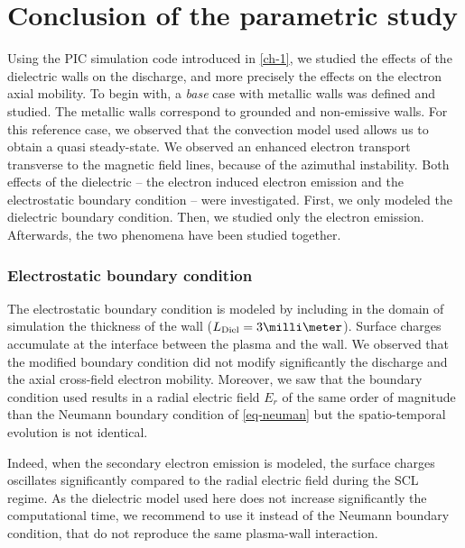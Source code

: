 
\section{Conclusion of the parametric study}
  \label{sec-conclusion_ch2}
  
  Using the \ac{PIC} simulation code introduced in \cref{ch-1}, we studied the effects of the dielectric walls on the discharge, and more precisely the effects on the electron axial mobility.
  To begin with, a \emph{base} case with metallic walls was defined and studied.
  The metallic walls correspond to grounded and non-emissive walls.
  For this reference case, we observed that the convection model used allows us to obtain a quasi steady-state.
  We observed an enhanced electron transport transverse to the magnetic field lines, because of the azimuthal instability.
  Both effects of the dielectric -- the electron induced electron emission and the electrostatic boundary condition -- were investigated.
  First, we  only modeled the dielectric boundary condition. Then, we studied only the electron emission. Afterwards, the two phenomena have been studied together.
  
  \subsubsection*{Electrostatic boundary condition}
  
  The electrostatic boundary condition is modeled by including in the domain of simulation the thickness of the wall ($L_{\rm Diel} = 3 \milli\meter$).
  Surface charges accumulate at the interface between the plasma and the wall.
  We observed that the modified boundary condition did not modify significantly the discharge and the axial cross-field electron mobility.
  Moreover, we saw that the boundary condition used results in a radial electric field $E_r$ of the same order of magnitude than the Neumann boundary condition of \cref{eq-neuman} but the spatio-temporal evolution is not identical.
  
  Indeed, when the secondary electron emission is modeled, the surface charges oscillates significantly compared to the radial electric field during the \ac{SCL} regime.
  As the dielectric model used here does not increase significantly the computational time, we recommend to use it instead of the Neumann boundary condition, that do not reproduce the same plasma-wall interaction.
  
